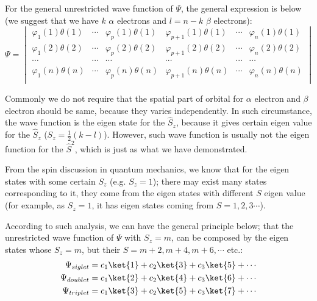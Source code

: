 For the general unrestricted wave function of $\Psi$, the general
expression is below (we suggest that we have $k$ $\alpha$ electrons
and $l=n-k$ $\beta$ electrons):
\begin{equation}\label{}
\Psi =
 \begin{vmatrix}
   \varphi_{1}(1)\theta(1) &  \cdots & \varphi_{p}(1)\theta(1) & 
   \varphi_{p+1}(1)\theta(1) & \cdots  & \varphi_{n}(1)\theta(1)  \\
   \varphi_{1}(2)\theta(2) &  \cdots & \varphi_{p}(2)\theta(2) & 
   \varphi_{p+1}(2)\theta(2) & \cdots  & \varphi_{n}(2)\theta(2)  \\
   \cdots                  & \cdots  & \cdots                 & 
   \cdots                   & \cdots  & \cdots                  \\
   \varphi_{1}(n)\theta(n) & \cdots  & \varphi_{p}(n)\theta(n) & 
   \varphi_{p+1}(n)\theta(n) & \cdots  & \varphi_{n}(n)\theta(n)  \\
 \end{vmatrix}
\end{equation}

Commonly we do not require that the spatial part of orbital for
$\alpha$ electron and $\beta$ electron should be same, because
they varies independently. In such circumstance, the wave function
is the eigen state for the $\hat{S}_{z}$, because it gives certain
eigen value for the $\hat{S}_{z}$ ($S_{z} = \frac{1}{2}(k-l)$).
However, such wave function is usually not the eigen function for
the $\hat{S}^{2}$, which is just as what we have demonstrated.

From the spin discussion in quantum mechanics, we know that for the
eigen states with some certain $S_{z}$ (e.g. $S_{z} = 1$); there may
exist many states corresponding to it, they come from the eigen
states with different $S$ eigen value (for example, as $S_{z} = 1$,
it has eigen states coming from $S=1,2,3 \cdots$).

According to such analysis, we can have the general principle below;
that the unrestricted wave function of $\Psi$ with $S_{z} = m$, can
be composed by the eigen states whose $S_{z} = m$, but their $S =
m+2, m+4, m+6, \cdots$ etc.:
\begin{align}\label{}
\Psi_{siglet} &= c_{1}\ket{1} + c_{2}\ket{3} + c_{3}\ket{5} + \cdots
\nonumber \\
\Psi_{doublet} &= c_{1}\ket{2} + c_{2}\ket{4} + c_{3}\ket{6} +
\cdots
\nonumber \\
\Psi_{triplet} &= c_{1}\ket{3} + c_{2}\ket{5} + c_{3}\ket{7} +
\cdots
\end{align}

